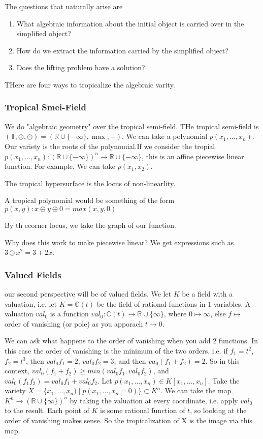 \documentclass[11pt]{article}
\theoremstyle{definition}
\def\RR{{\mathbb R}}
\def\CC{{\mathbb C}}
\begin{document}
The questions that naturally arise are
\begin{enumerate}
    \item What algebraic information about the initial object is carried over in the simplified object?
    \item How do we extract the information carried by the simplified object?
    \item Does the lifting problem have a solution?
\end{enumerate}


THere are four ways to tropicalize the algebraic varity.

\subsubsection{Tropical Smei-Field}
We do "algebraic geometry" over the tropical semi-field. THe tropical semi-field is $(\mathbb{T}, \oplus, \odot ) = ( \RR \cup \{- \infty\}, \max, + )$. We can take a polynomial $p(x_1, \dots, x_n)$. Our variety is the roots of the polynomial.If we consider the tropial $p(x_1, \dots, x_n) : (\RR \cup \{- \infty\})^n \rightarrow \RR \cup \{- \infty\}$, this is an affine piecewise linear function. For example, We can take $p(x_1, x_2)$.



The tropical hypersurface is the locus of non-linearlity.

A tropical polynomial would be something of the form $p(x,y) : x \oplus y \oplus 0= max(x,y,0)$


By th ecorner locus, we take the graph of our function.





Why does this work to make piecewise linear? We get expressions such as $3 \odot x^2 = 3 + 2x$.


\subsubsection{Valued Fields}

our second perspective will be of valued fields. We let $K$ be a field with a valuation, i.e. let $K= \CC(t)$ be the field of rational functions in 1 variables. A valuation $val_0$ is a function $val_0: \CC(t) \rightarrow \RR \cup \{ \infty\}$, where $0 \mapsto \infty$, else $f \mapsto$ order of vanishing (or pole) as you apporach $t \rightarrow 0$.


We can ask what happens to the order of vanishing when you add 2 functions. In this case the order of vanishing is the minimum of the two orders. i.e. if $f_1=t^2$, $f_2=t^3$, then $val_0 f_1 = 2$, $val_0 f_2 = 3$, and then $va_0(f_1+f_2)=2$.  So in this context, $val_0(f_1+f_2) \geq min(val_0 f_1, val_0f_2)$, and $val_0(f_1f_2) = val_0 f_1 + val_0 f_2$. Let $p(x_1, \dots, x_n) \in K[x_1, \dots, x_n]$. Take the variety $X = \{x_1, \dots, x_n) \; |\; p(x_1, \dots, x_n=0) \} \subset K^n$. We can take the map $K^n \rightarrow (\RR \cup \{ \infty\})^n$ by taking the valuation at every coordinate, i.e. apply  $val_{0}$ to the result. Each point of $K$ is some rational function of $t$, so looking at the order of vanishing makes sense. So the tropicalization of X is the image via this map.
\end{document}

